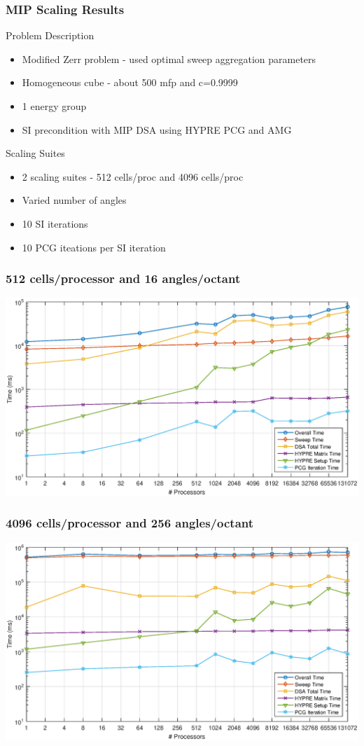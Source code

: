 \documentclass[compress,10pt]{beamer}
\begin{document}
\begin{frame}[t]
{
\frametitle{MIP Scaling Results}
\begin{block}{Problem Description}
	\begin{itemize}
	\item Modified Zerr problem - used optimal sweep aggregation parameters
	\item Homogeneous cube - about 500 mfp and c=0.9999
	\item 1 energy group
	\item SI precondition with MIP DSA using HYPRE PCG and AMG
	\end{itemize}
\end{block}
\begin{block}{Scaling Suites}
	\begin{itemize}
	\item 2 scaling suites - 512 cells/proc and 4096 cells/proc
	\item Varied number of angles
	\item 10 SI iterations
	\item 10 PCG iteations per SI iteration
	\end{itemize}
\end{block}
}
{
\frametitle{512 cells/processor and 16 angles/octant}
\centering
\includegraphics[width=\textwidth]{images/A128.eps}
}
{
\frametitle{4096 cells/processor and 256 angles/octant}
\centering
\includegraphics[width=\textwidth]{images/A2048.eps}
}
\end{frame}
\end{document}
